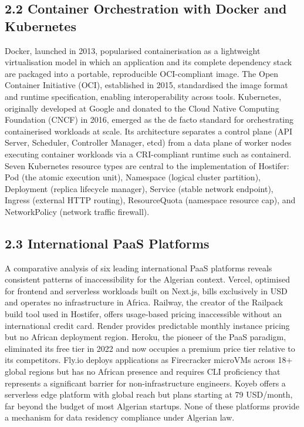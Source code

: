 \subsection*{2.2 Container Orchestration with Docker and Kubernetes}

Docker, launched in 2013, popularised containerisation as a lightweight virtualisation model in which an application and its complete dependency stack are packaged into a portable, reproducible OCI-compliant image. The Open Container Initiative (OCI), established in 2015, standardised the image format and runtime specification, enabling interoperability across tools. Kubernetes, originally developed at Google and donated to the Cloud Native Computing Foundation (CNCF) in 2016, emerged as the de facto standard for orchestrating containerised workloads at scale. Its architecture separates a control plane (API Server, Scheduler, Controller Manager, etcd) from a data plane of worker nodes executing container workloads via a CRI-compliant runtime such as containerd. Seven Kubernetes resource types are central to the implementation of Hostifer: Pod (the atomic execution unit), Namespace (logical cluster partition), Deployment (replica lifecycle manager), Service (stable network endpoint), Ingress (external HTTP routing), ResourceQuota (namespace resource cap), and NetworkPolicy (network traffic firewall).

\subsection*{2.3 International PaaS Platforms}

A comparative analysis of six leading international PaaS platforms reveals consistent patterns of inaccessibility for the Algerian context. Vercel, optimised for frontend and serverless workloads built on Next.js, bills exclusively in USD and operates no infrastructure in Africa. Railway, the creator of the Railpack build tool used in Hostifer, offers usage-based pricing inaccessible without an international credit card. Render provides predictable monthly instance pricing but no African deployment region. Heroku, the pioneer of the PaaS paradigm, eliminated its free tier in 2022 and now occupies a premium price tier relative to its competitors. Fly.io deploys applications as Firecracker microVMs across 18+ global regions but has no African presence and requires CLI proficiency that represents a significant barrier for non-infrastructure engineers. Koyeb offers a serverless edge platform with global reach but plans starting at 79 USD/month, far beyond the budget of most Algerian startups. None of these platforms provide a mechanism for data residency compliance under Algerian law.

